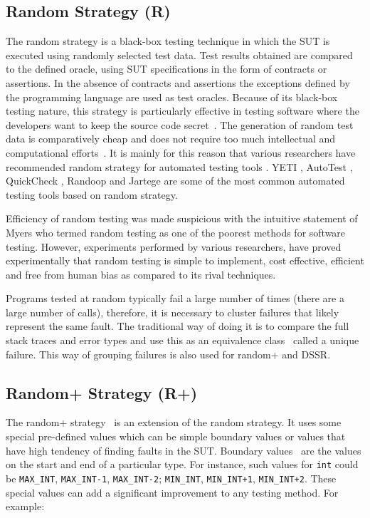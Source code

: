 \subsection{Random Strategy (R)}
The random strategy is a black-box testing technique in which the SUT is executed using randomly selected test data. Test results obtained are compared to the defined oracle, using SUT specifications in the form of contracts or assertions. In the absence of contracts and assertions the exceptions defined by the programming language are used as test oracles. Because of its black-box testing nature, this strategy is particularly effective in testing software where the developers want to keep the source code secret~\cite{chen2010adaptive}. The generation of random test data is comparatively cheap and does not require too much intellectual and computational efforts~\cite{ciupa2011number, ciupa2008finding}. It is mainly for this reason that various researchers have recommended random strategy for automated testing tools \cite{ciupa2008artoo}.
 YETI \cite{Oriol2010b, oriol2010yeti}, AutoTest \cite{ciupa2007experimental, leitner2007reconciling}, QuickCheck \cite{claessen2011quickcheck}, Randoop \cite{pacheco2007feedback} and Jartege \cite{oriat2005jartege} are some of the most common automated testing tools based on random strategy.

\indent Efficiency of random testing was made suspicious with the intuitive statement of Myers \cite{myers2011art} who termed random testing as one of the poorest methods for software testing. However, experiments performed by various researchers, \cite{ciupa2007experimental, duran1981report, duran1984evaluation, hamlet1994random, ntafos2001comparisons} have proved experimentally that random testing is simple to implement, cost effective, efficient and free from human bias as compared to its rival techniques.

Programs tested at random typically fail a large number of times (there are a large number of calls), therefore, it is necessary to cluster failures that likely represent the same fault. The traditional way of doing it is to compare the full stack traces and error types and use this as an equivalence class~\cite{ciupa2007experimental, oriol2012random} called a unique failure. This way of grouping failures is also used for random+ and DSSR.

\subsection{Random+ Strategy (R+)}
The random+ strategy~\cite{leitner2007reconciling} is an extension of the random strategy. It uses some special pre-defined values which can be simple boundary values or values that have high tendency of finding faults in the SUT. Boundary values~\cite{beizer2003software} are the values on the start and end of a particular type. For instance, such values for \verb+int+ could be \verb+MAX_INT+, \verb+MAX_INT-1+, \verb+MAX_INT-2+; \verb+MIN_INT+, \verb-MIN_INT+1-, \verb-MIN_INT+2-. These special values can add a significant improvement to any testing method. For example:

